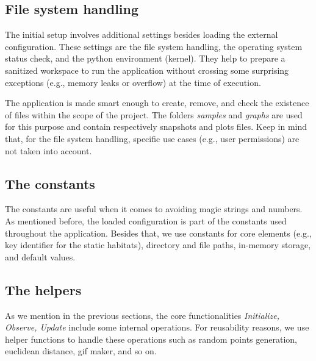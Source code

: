 \subsection{File system handling}
The initial setup involves additional settings besides loading the external configuration. These settings are the file system handling, the operating system status check, and the python environment (kernel). They help to prepare a sanitized workspace to run the application without crossing some surprising exceptions (e.g., memory leaks or overflow) at the time of execution.

The application is made smart enough to create, remove, and check the existence of files within the scope of the project. The folders \emph{samples} and \emph{graphs} are used for this purpose and contain respectively snapshots and plots files. Keep in mind that, for the file system handling, specific use cases (e.g., user permissions) are not taken into account.

\subsection{The constants}
The constants are useful when it comes to avoiding magic strings and numbers. As mentioned before, the loaded configuration is part of the constants used throughout the application. Besides that, we use constants for core elements (e.g., key identifier for the static habitats), directory and file paths, in-memory storage, and default values.

\subsection{The helpers}
As we mention in the previous sections, the core functionalities \emph{Initialize, Observe, Update} include some internal operations. For reusability reasons, we use helper functions to handle these operations such as random points generation, euclidean distance, gif maker, and so on.

